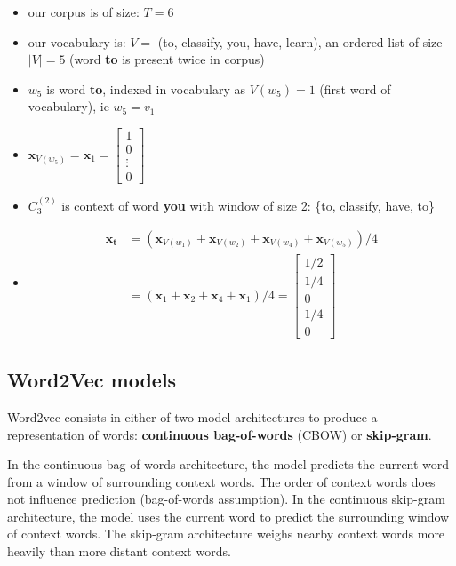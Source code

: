 \begin{itemize}
	\item our corpus is of size: $T=6$
	\item our vocabulary is: $V =$ (to, classify, you, have, learn), an ordered list of size $|V| = 5$ (word \textbf{to} is present twice in corpus)
	\item $w_5$ is word \textbf{to}, indexed in vocabulary as $V(w_5) = 1$ (first word of vocabulary), ie $w_5 = v_1$
	\item $\mathbf{x}_{V(w_5)} = \mathbf{x}_{1} = \begin{bmatrix} 
		1 \\
		0 \\
		\vdots\\
		0
	\end{bmatrix}$
	\item $C_3^{(2)}$ is context of word \textbf{you} with window of size 2: \{to, classify, have, to\}
	\item 
		\begin{align}
		\mathbf{\bar x_t} &= (\mathbf{x}_{V(w_1)} +\mathbf{x}_{V(w_2)} + \mathbf{x}_{V(w_4)} + \mathbf{x}_{V(w_5)}) / 4 \\ 
		&= (\mathbf{x}_{1} +\mathbf{x}_{2} + \mathbf{x}_{4} + \mathbf{x}_{1}) / 4 
		=\begin{bmatrix} 
			1/2 \\
			1/4 \\
			0\\
			1/4\\
			0
		\end{bmatrix}
	\end{align}
\end{itemize}


\subsection{Word2Vec models}

Word2vec consists in either of two model architectures to produce a representation of words: \textbf{continuous bag-of-words} (CBOW) or \textbf{skip-gram}. 

In the continuous bag-of-words architecture, the model predicts the current word from a window of surrounding context words. The order of context words does not influence prediction (bag-of-words assumption). In the continuous skip-gram architecture, the model uses the current word to predict the surrounding window of context words. 
The skip-gram architecture weighs nearby context words more heavily than more distant context words.

